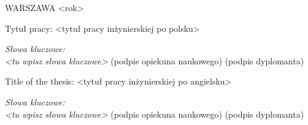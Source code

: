 \vspace{15mm}

WARSZAWA <rok> %

\newpage
\thispagestyle{empty}
\phantom{Nothing here}
\newpage
\clearpage
\phantom{Here neither}

\setcounter{page}{3}
\vspace{-1.5cm}
\begin{flushleft}
	Tytuł pracy: <tytuł pracy inżynierskiej po polsku> %
\end{flushleft}
\vspace{0.5cm}
\lipsum[1-4] %
\vspace{0.5cm}
\noindent \textit{Słowa kluczowe: \\ <tu wpisz słowa kluczowe>} %
\vfill
(podpis opiekuna naukowego) \hfill (podpis dyplomanta)

\newpage
\thispagestyle{empty}
\phantom{Nothing here}
\newpage
\clearpage
\phantom{Here neither}

\setcounter{page}{5}
\vspace{-1.5cm}
\begin{flushleft}
	Title of the thesis: <tytuł pracy inżynierskiej po angielsku> %
\end{flushleft}
\vspace{0.5cm}
\lipsum[1-4] %
\vspace{0.5cm}
\noindent \textit{Słowa kluczowe: \\ <tu wpisz słowa kluczowe>} %
\vfill
(podpis opiekuna naukowego) \hfill (podpis dyplomanta)

\newpage
\thispagestyle{empty}
\phantom{Nothing here}
\newpage
\clearpage
\phantom{Here neither}

